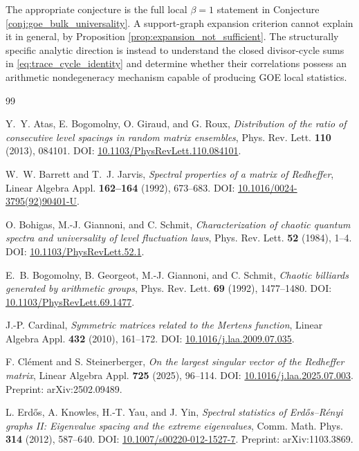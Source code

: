 \documentclass[11pt]{amsart}
\numberwithin{equation}{section}
\theoremstyle{plain}
\theoremstyle{definition}
\theoremstyle{remark}
\begin{document}
The appropriate conjecture is the full local $\beta=1$ statement in Conjecture \ref{conj:goe_bulk_universality}.  A support-graph expansion criterion cannot explain it in general, by Proposition \ref{prop:expansion_not_sufficient}.  The structurally specific analytic direction is instead to understand the closed divisor-cycle sums in \eqref{eq:trace_cycle_identity} and determine whether their correlations possess an arithmetic nondegeneracy mechanism capable of producing GOE local statistics.

\begin{thebibliography}{99}

Y.~Y. Atas, E. Bogomolny, O. Giraud, and G. Roux,
\emph{Distribution of the ratio of consecutive level spacings in random matrix ensembles},
Phys. Rev. Lett. \textbf{110} (2013), 084101.
DOI: \href{https://doi.org/10.1103/PhysRevLett.110.084101}{10.1103/PhysRevLett.110.084101}.

W.~W. Barrett and T.~J. Jarvis,
\emph{Spectral properties of a matrix of Redheffer},
Linear Algebra Appl. \textbf{162--164} (1992), 673--683.
DOI: \href{https://doi.org/10.1016/0024-3795(92)90401-U}{10.1016/0024-3795(92)90401-U}.

O. Bohigas, M.-J. Giannoni, and C. Schmit,
\emph{Characterization of chaotic quantum spectra and universality of level fluctuation laws},
Phys. Rev. Lett. \textbf{52} (1984), 1--4.
DOI: \href{https://doi.org/10.1103/PhysRevLett.52.1}{10.1103/PhysRevLett.52.1}.

E.~B. Bogomolny, B. Georgeot, M.-J. Giannoni, and C. Schmit,
\emph{Chaotic billiards generated by arithmetic groups},
Phys. Rev. Lett. \textbf{69} (1992), 1477--1480.
DOI: \href{https://doi.org/10.1103/PhysRevLett.69.1477}{10.1103/PhysRevLett.69.1477}.

J.-P. Cardinal,
\emph{Symmetric matrices related to the Mertens function},
Linear Algebra Appl. \textbf{432} (2010), 161--172.
DOI: \href{https://doi.org/10.1016/j.laa.2009.07.035}{10.1016/j.laa.2009.07.035}.

F. Cl\'ement and S. Steinerberger,
\emph{On the largest singular vector of the Redheffer matrix},
Linear Algebra Appl. \textbf{725} (2025), 96--114.
DOI: \href{https://doi.org/10.1016/j.laa.2025.07.003}{10.1016/j.laa.2025.07.003}.
Preprint: arXiv:2502.09489.

L. Erd\H{o}s, A. Knowles, H.-T. Yau, and J. Yin,
\emph{Spectral statistics of Erd\H{o}s--R\'enyi graphs II: Eigenvalue spacing and the extreme eigenvalues},
Comm. Math. Phys. \textbf{314} (2012), 587--640.
DOI: \href{https://doi.org/10.1007/s00220-012-1527-7}{10.1007/s00220-012-1527-7}.
Preprint: arXiv:1103.3869.


\end{thebibliography}
\end{document}
